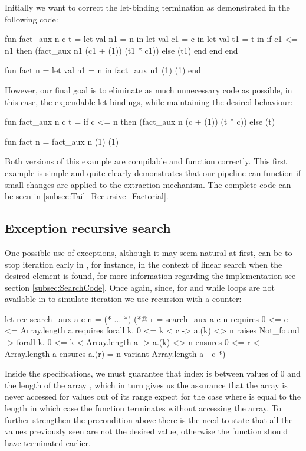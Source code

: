 Initially we want to correct the let-binding termination as demonstrated in the following code:

\begin{cakeml}
fun fact_aux n c t = let val n1 = n in
  let val c1 = c in
  let val t1 = t in
  if c1 <= n1 then (fact_aux n1 (c1 + (1)) (t1 * c1))  else (t1)
  end end end

fun fact n = let val n1 = n in fact_aux n1 (1) (1) end
\end{cakeml}

However, our final goal is to eliminate as much unnecessary code as possible, in this case, the expendable let-bindings, while 
maintaining the desired behaviour:

\begin{cakeml}
fun fact_aux n c t = 
  if c <= n then (fact_aux n (c + (1)) (t * c))  else (t)

fun fact n = fact_aux n (1) (1)
\end{cakeml}

Both versions of this example are compilable and function correctly. This first example is simple and quite clearly demonstrates that
our pipeline can function if small changes are applied to the extraction mechanism. The complete code can be seen in \ref{subsec:Tail_Recursive_Factorial}.

\subsection{Exception recursive search}

One possible use of exceptions, although it may seem natural at first, can be to stop iteration early in \ocaml, for instance, in the 
context of linear search when the desired element is found, for more information regarding the implementation see section 
\ref{subsec:SearchCode}. Once again, since, for and while loops are not available in \cml to simulate iteration we use recursion 
with a counter:

\begin{gospell}
let rec search_aux a c n = (* ... *)
(*@
  r = search_aux a c n
  requires 0 <= c <= Array.length a
  requires forall k. 0 <= k < c -> a.(k) <> n
  raises Not_found -> forall k. 0 <= k < Array.length a -> a.(k) <> n
  ensures 0 <= r < Array.length a
  ensures a.(r) = n
  variant Array.length a - c
*)
\end{gospell}

Inside the \gospel specifications, we must guarantee that index  is between values of 0 and the length of the array 
, which in turn gives us the assurance that the array is never accessed for values out of its range expect for the case 
where  is equal to the length in which case the function terminates without accessing the array. To further strengthen the
precondition above there is the need to state that all the values previously seen are not the desired value, otherwise the function
should have terminated earlier.

